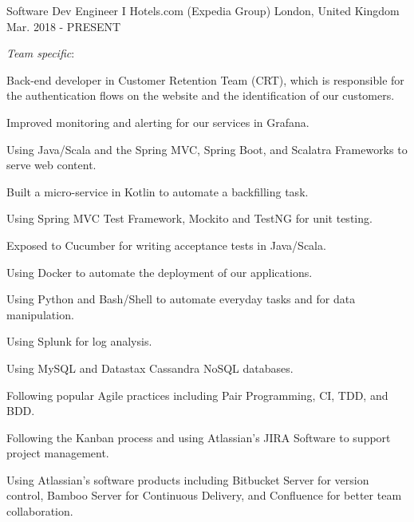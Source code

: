 

\begin{cventries}

  \cventry
    {Software Dev Engineer I} %
    {Hotels.com (Expedia Group)} %
    {London, United Kingdom} %
    {Mar. 2018 - PRESENT} %
        {
    \textit{Team specific}:
    \vspace{12pt}
      \begin{cvitems} %
        \item {Back-end developer in Customer Retention Team (CRT), which is responsible for the authentication flows on the website and the identification of our customers.}
        \item{Improved monitoring and alerting for our services in Grafana.}
		\item {Using Java/Scala and the Spring MVC, Spring Boot, and Scalatra Frameworks to serve web content.}
		\item {Built a micro-service in Kotlin to automate a backfilling task.}
        \item {Using Spring MVC Test Framework, Mockito and TestNG for unit testing.}
        \item{Exposed to Cucumber for writing acceptance tests in Java/Scala.}
        \item {Using Docker to automate the deployment of our applications.}
        \item {Using Python and Bash/Shell to automate everyday tasks and for data manipulation.}
        \item {Using Splunk for log analysis.}
       \item {Using MySQL and Datastax Cassandra NoSQL databases.}
        \item {Following popular Agile practices including Pair Programming, CI, TDD, and BDD.}
        \item {Following the Kanban process and using Atlassian's JIRA Software to support project management.}
        \item {Using Atlassian's software products including Bitbucket Server for version control, Bamboo Server for Continuous Delivery, and Confluence for better team collaboration.}

\end{cvitems}}
\end{cventries}
